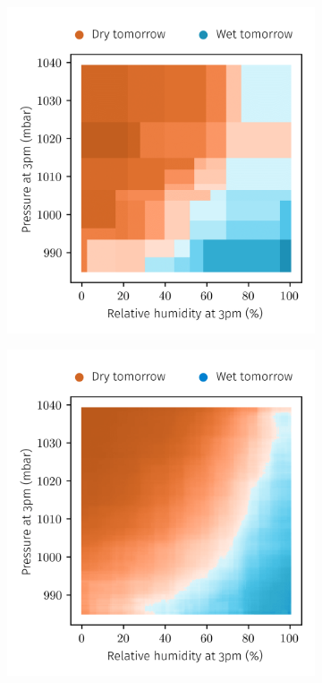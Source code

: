 \begin{figure}
  \centering
  \begin{subfigure}{0.49\textwidth}
    \centering
    \includegraphics[scale=0.6]{graphics/weather_forest_2.png}%
  \end{subfigure}
  \begin{subfigure}{0.49\textwidth}
    \centering
    \includegraphics[scale=0.6]{graphics/weather_forest_30.png}%
  \end{subfigure}
\end{figure}

